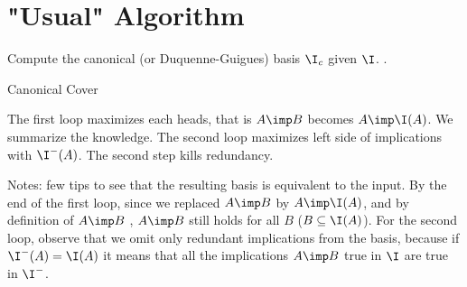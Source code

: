 \section{"Usual" Algorithm}

Compute the canonical (or Duquenne-Guigues) basis $\I_c$ given $\I$. 
\cite{guigues_familles_1986, b._ganter_conceptual_2016}. 

\begin{algorithm}[H]
	

	
	\caption{Canonical Cover}	
\end{algorithm}


\vspace{1.2em}

\noindent The first loop maximizes each heads, that is $A \imp B$ becomes $A 
\imp \I(A)$. We summarize the knowledge. The second loop maximizes left side
of implications with $\I^{-}(A)$. The second step kills redundancy.

\vspace{1.2em}

\noindent Notes: few tips to see that the resulting basis is equivalent to the 
input. By the end of the first loop, since we replaced $A \imp B$ by $A \imp 
\I(A)$, and by definition of $A \imp B$ , $A \imp B$ still holds for all $B$
($B \subseteq \I(A)$). For the second loop, observe that we omit only redundant
implications from the basis, because if $\I^{-}(A) = \I(A)$ it means that all
the implications $A \imp B$ true in $\I$ are true in $\I^{-}$. 